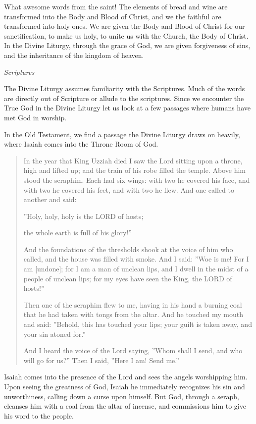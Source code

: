 \documentclass[
]{article}
\newcommand{\RL}[1]{\beginR #1\endR}
\begin{document}
What awesome words from the saint! The elements of bread and wine are
transformed into the Body and Blood of Christ, and we the faithful are
transformed into holy ones. We are given the Body and Blood of Christ
for our sanctification, to make us holy, to unite us with the Church,
the Body of Christ. In the Divine Liturgy, through the grace of God, we
are given forgiveness of sins, and the inheritance of the kingdom of
heaven.

\emph{Scriptures}

The Divine Liturgy assumes familiarity with the Scriptures. Much of the
words are directly out of Scripture or allude to the scriptures. Since
we encounter the True God in the Divine Liturgy let us look at a few
passages where humans have met God in worship.

In the Old Testament, we find a passage the Divine Liturgy draws on
heavily, where Isaiah comes into the Throne Room of God.

\begin{quote}
In the year that King Uzziah died I saw the Lord sitting upon a throne,
high and lifted up; and the train of his robe filled the temple. Above
him stood the seraphim. Each had six wings: with two he covered his
face, and with two he covered his feet, and with two he flew. And one
called to another and said:

\RL{''}Holy, holy, holy is the LORD of hosts;

the whole earth is full of his glory!''

And the foundations of the thresholds shook at the voice of him who
called, and the house was filled with smoke. And I said: \RL{''}Woe is
me! For I am {[}undone{]}; for I am a man of unclean lips, and I dwell
in the midst of a people of unclean lips; for my eyes have seen the
King, the LORD of hosts!''

Then one of the seraphim flew to me, having in his hand a burning coal
that he had taken with tongs from the altar. And he touched my mouth and
said: \RL{''}Behold, this has touched your lips; your guilt is taken
away, and your sin atoned for.''

And I heard the voice of the Lord saying, \RL{''}Whom shall I send, and
who will go for us?'' Then I said, \RL{''}Here I am! Send me.''
\end{quote}

Isaiah comes into the presence of the Lord and sees the angels
worshipping him. Upon seeing the greatness of God, Isaiah he immediately
recognizes his sin and unworthiness, calling down a curse upon himself.
But God, through a seraph, cleanses him with a coal from the altar of
incense, and commissions him to give his word to the people.
\end{document}
